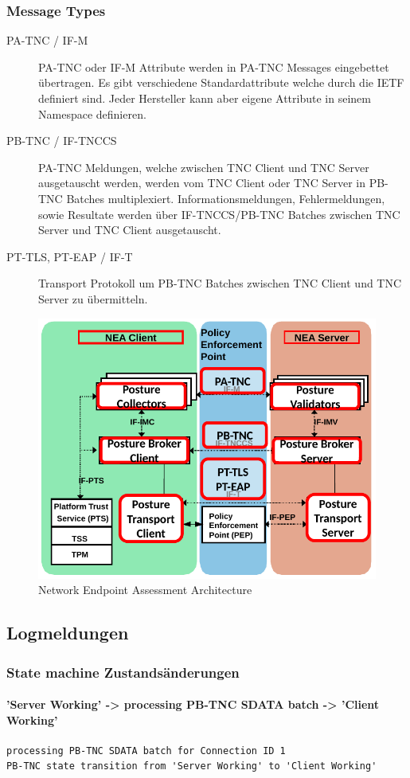 \subsubsection{Message Types}
\begin{description}
    \item[PA-TNC / IF-M] PA-TNC oder IF-M Attribute werden in PA-TNC Messages eingebettet übertragen. Es gibt verschiedene Standardattribute welche durch die IETF definiert sind. Jeder Hersteller kann aber eigene Attribute in seinem Namespace definieren.
    \item[PB-TNC / IF-TNCCS] PA-TNC Meldungen, welche zwischen TNC Client und TNC Server ausgetauscht werden, werden vom TNC Client oder TNC Server in PB-TNC Batches multiplexiert. Informationsmeldungen, Fehlermeldungen, sowie Resultate werden über IF-TNCCS/PB-TNC Batches zwischen TNC Server und TNC Client ausgetauscht.
    \item[PT-TLS, PT-EAP / IF-T] Transport Protokoll um PB-TNC Batches zwischen TNC Client und TNC Server zu übermitteln.
\end{description}
\begin{figure}[h]
\centering
\includegraphics[width=0.7\linewidth]{images/nea.png}
\caption{Network Endpoint Assessment Architecture}
\label{fig:neaarchitecture}
\end{figure}

\subsection{Logmeldungen}
\subsubsection{State machine Zustandsänderungen}
\paragraph{'Server Working' -> processing PB-TNC SDATA batch -> 'Client Working'}
\begin{lstlisting}
processing PB-TNC SDATA batch for Connection ID 1
PB-TNC state transition from 'Server Working' to 'Client Working'
\end{lstlisting}

